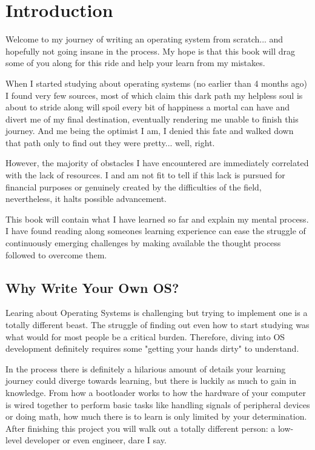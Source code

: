 \chapter{Introduction}

Welcome to my journey of writing an operating system from scratch... and hopefully not going insane in the process.
My hope is that this book will drag some of you along for this ride and help your learn from my mistakes. 

When I started studying about operating systems (no earlier than 4 months ago) I found very few sources, most of which
claim this dark path my helpless soul is about to stride along will spoil every bit of happiness a mortal can have and 
divert me of my final destination, eventually rendering me unable to finish this journey.
And me being the optimist I am, I denied this fate and walked down that path only to find out they were pretty... well, right.

However, the majority of obstacles I have encountered are immediately correlated with the lack of resources.
I and am not fit to tell if this lack is pursued for financial purposes or genuinely created by the difficulties of the field,
nevertheless, it halts possible advancement.

This book will contain what I have learned so far and explain my mental process. I have found reading along someones
learning experience can ease the struggle of continuously emerging challenges by making available the thought process followed
to overcome them.

\section{Why Write Your Own OS?}

Learing about Operating Systems is challenging but trying to implement one is a totally different beast. The struggle of
finding out even how to start studying was what would for most people be a critical burden. 
Therefore, diving into OS development definitely requires some "getting your hands dirty" to understand.

In the process there is definitely a hilarious amount of details your learning journey could diverge towards learning, but 
there is luckily as much to gain in knowledge. From how a bootloader works to how the hardware of your computer is wired
together to perform basic tasks like handling signals of peripheral devices or doing math, how much there is to learn is only 
limited by your determination. After finishing this project you will walk out a totally different person: a low- level developer
or even engineer, dare I say. 

